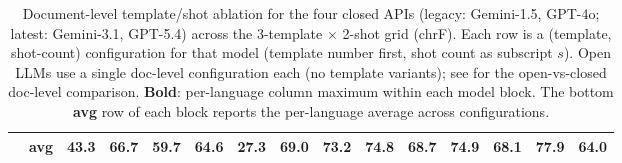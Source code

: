 \begin{table}[t]
{\begin{tabular}{llrrrrrrrrrrrrr}
\cmidrule(l){2-15}
 & \textbf{avg} & 43.3 & 66.7 & 59.7 & 64.6 & 27.3 & 69.0 & 73.2 & 74.8 & 68.7 & 74.9 & 68.1 & 77.9 & 64.0 \\
\bottomrule
\end{tabular}
}
\caption{Document-level template/shot ablation for the four closed APIs (legacy: Gemini-1.5, GPT-4o; latest: Gemini-3.1, GPT-5.4) across the 3-template $\times$ 2-shot grid (chrF). Each row is a (template, shot-count) configuration for that model (template number first, shot count as subscript $s$). Open LLMs use a single doc-level configuration each (no template variants); see  for the open-vs-closed doc-level comparison. \textbf{Bold}: per-language column maximum within each model block. The bottom \textbf{avg} row of each block reports the per-language average across configurations.}
\label{tab:doc_template_shot_ablation_chrf}
\end{table}
